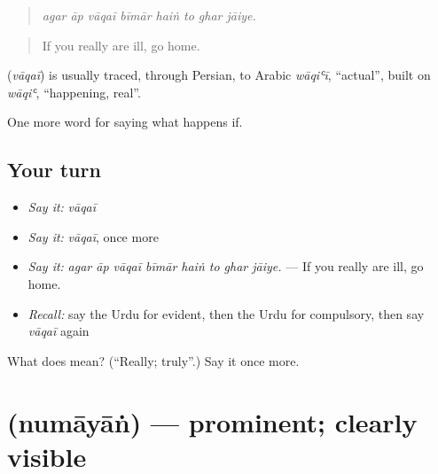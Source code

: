 \begin{quote}
       
\end{quote}

\begin{quote}
\emph{agar āp vāqaī bīmār haiṅ to ghar jāiye.}
\end{quote}

\begin{quote}
If you really are ill, go home.
\end{quote}

\begin{cousinweb}
\textbf{} (\emph{vāqaī}) is usually traced, through Persian, to Arabic \emph{wāqiʿī}, \textquotedblleft{}actual\textquotedblright{}, built on \emph{wāqiʿ}, \textquotedblleft{}happening, real\textquotedblright{}.
\end{cousinweb}

\begin{grammarlens}[title={What you've built}]
One more word for saying what happens if.
\end{grammarlens}

\subsection*{Your turn}
\begin{itemize}
\raggedright
  \item \emph{Say it:} \emph{vāqaī}
  \item \emph{Say it:} \emph{vāqaī}, once more
  \item \emph{Say it:} \emph{agar āp vāqaī bīmār haiṅ to ghar jāiye.} — If you really are ill, go home.
  \item \emph{Recall:} say the Urdu for evident, then the Urdu for compulsory, then say \emph{vāqaī} again
\end{itemize}

\begin{tcolorbox}[breakable,colback=teal!4,colframe=teal!35!black,title={Before you move on}]
What does  mean? (\textquotedblleft{}Really; truly\textquotedblright{}.) Say it once more.
\end{tcolorbox}
\section[\texorpdfstring{\ur{نمایاں} (numāyāṅ)}{نمایاں (numāyāṅ)}]{ (numāyāṅ) — prominent; clearly visible}

